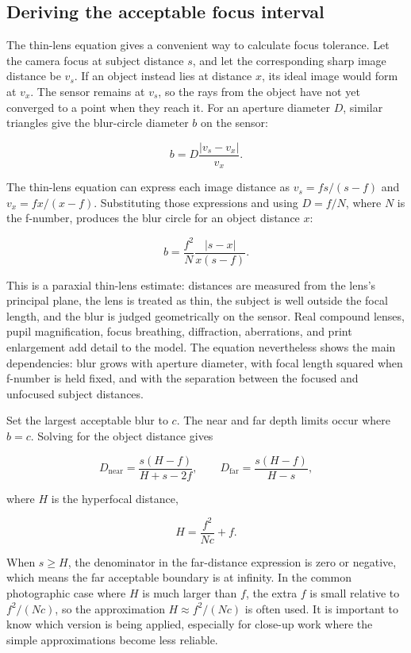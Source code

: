 \subsection{Deriving the acceptable focus interval}\label{03-visual-computing-i-ch003-deriving-the-acceptable-focus-interval}

\hypertarget{03-visual-computing-i-ch003-deriving-the-acceptable-focus-interval}{}

The thin-lens equation gives a convenient way to calculate focus tolerance. Let the camera focus at subject distance \(s\), and let the corresponding sharp image distance be \(v_s\). If an object instead lies at distance \(x\), its ideal image would form at \(v_x\). The sensor remains at \(v_s\), so the rays from the object have not yet converged to a point when they reach it. For an aperture diameter \(D\), similar triangles give the blur-circle diameter \(b\) on the sensor:

\[
b = D\frac{|v_s-v_x|}{v_x}.
\]

The thin-lens equation can express each image distance as \(v_s=fs/(s-f)\) and \(v_x=fx/(x-f)\). Substituting those expressions and using \(D=f/N\), where \(N\) is the f-number, produces the blur circle for an object distance \(x\):

\[
b=\frac{f^2}{N}\frac{|s-x|}{x(s-f)}.
\]

This is a paraxial thin-lens estimate: distances are measured from the lens's principal plane, the lens is treated as thin, the subject is well outside the focal length, and the blur is judged geometrically on the sensor. Real compound lenses, pupil magnification, focus breathing, diffraction, aberrations, and print enlargement add detail to the model. The equation nevertheless shows the main dependencies: blur grows with aperture diameter, with focal length squared when f-number is held fixed, and with the separation between the focused and unfocused subject distances.

Set the largest acceptable blur to \(c\). The near and far depth limits occur where \(b=c\). Solving for the object distance gives

\[
D_{\mathrm{near}}=\frac{s(H-f)}{H+s-2f},\qquad
D_{\mathrm{far}}=\frac{s(H-f)}{H-s},
\]

where \(H\) is the hyperfocal distance,

\[
H=\frac{f^2}{Nc}+f.
\]

When \(s\ge H\), the denominator in the far-distance expression is zero or negative, which means the far acceptable boundary is at infinity. In the common photographic case where \(H\) is much larger than \(f\), the extra \(f\) is small relative to \(f^2/(Nc)\), so the approximation \(H\approx f^2/(Nc)\) is often used. It is important to know which version is being applied, especially for close-up work where the simple approximations become less reliable.

